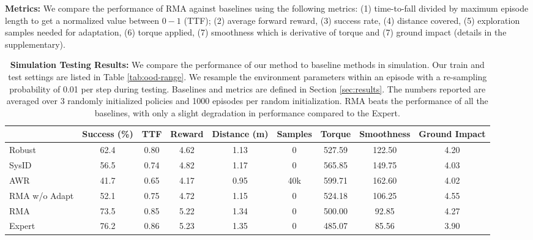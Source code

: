 \documentclass[conference]{IEEEtran}
\newcommand{\algo}{RMA}
\begin{document}
\vspace{0.6em}\noindent\textbf{Metrics:}
We compare the performance of RMA against baselines using the following metrics:  (1) time-to-fall divided by maximum episode length to get a normalized value between $0-1$ (TTF); (2) average forward reward, (3) success rate, (4) distance covered, (5) exploration samples needed for adaptation, (6) torque applied, (7) smoothness which is derivative of torque and (7) ground impact (details in the supplementary).

\begin{table}[t]
\begin{center}
\begin{tabular*}{0.95\textwidth}{@{}lcccccccc@{}}
\toprule
   & Success (\%) & TTF & Reward & Distance (m) & Samples & Torque & Smoothness & Ground Impact\\ 
\midrule
 Robust~\cite{tobin2017domain,peng2018sim} & 62.4 & 0.80 & 4.62 & 1.13 & 0 & 527.59 & 122.50 & 4.20\\
 SysID~\cite{yu2017preparing} & 56.5 & 0.74 & 4.82 & 1.17 & 0 & 565.85 & 149.75 & 4.03\\
 AWR~\cite{peng2020learning} & 41.7 & 0.65 & 4.17 & 0.95 & 40k & 599.71 & 162.60 & 4.02\\
 \algo{} w/o Adapt & 52.1 & 0.75 & 4.72 & 1.15 & 0 & 524.18 & 106.25 & 4.55\\
 \algo{} & 73.5 & 0.85 & 5.22 & 1.34 & 0 & 500.00 & 92.85 & 4.27\\
\midrule 
 Expert & 76.2 & 0.86 & 5.23 & 1.35 & 0 & 485.07 & 85.56 & 3.90\\
\bottomrule
\end{tabular*}
\caption{\label{tab:sim-metrics} \textbf{Simulation Testing Results:} We compare the performance of our method to baseline methods in simulation. Our train and test settings are listed in Table \ref{tab:ood-range}. We resample the environment parameters within an episode with a re-sampling probability of 0.01 per step during testing. Baselines and metrics are defined in Section \ref{sec:results}. The numbers reported are averaged over 3 randomly initialized policies and 1000 episodes per random initialization. \algo{} beats the performance of all the baselines, with only a slight degradation in performance compared to the Expert.
}
\end{center}
\vspace{-0.1in}
\end{table}
\end{document}
